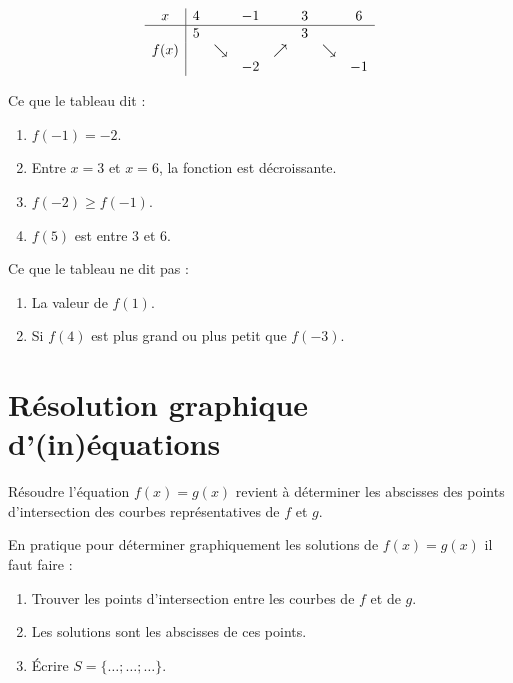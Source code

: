 \begin{example}
    \begin{equation*}
        \begin{array}[]{c|ccccccc}
            x&4&&-1&&3&&6\\
            \hline
            &5&&&&3&&\\
            f(x)&&\searrow&&\nearrow&&\searrow&\\
            &&&-2&&&&-1\\
        \end{array}
    \end{equation*}

Ce que le tableau dit :
\begin{enumerate}
    \item
        \( f(-1)=-2\).
    \item
        Entre \( x=3\) et \( x=6\), la fonction est décroissante.
    \item
        \( f(-2)\geq f(-1)\).
    \item
        \( f(5)\) est entre \( 3\) et \( 6\).
\end{enumerate}
Ce que le tableau ne dit pas :
\begin{enumerate}
    \item
        La valeur de \( f(1)\).
    \item
        Si \( f(4)\) est plus grand ou plus petit que \( f(-3)\).
\end{enumerate}

\end{example}

\section{Résolution graphique d'(in)équations} 

\begin{Aretenir}
    Résoudre l'équation $f(x)=g(x)$ revient à déterminer les abscisses des points d'intersection des courbes représentatives de \( f\) et \( g\).
\end{Aretenir}


En pratique pour déterminer graphiquement les solutions de \( f(x)=g(x)\) il faut faire :
\begin{enumerate}
    \item
        Trouver les points d'intersection entre les courbes de \( f\) et de \( g\).
    \item
        Les solutions sont les abscisses de ces points.
    \item
        Écrire \( S=\{ \ldots;\ldots;\ldots \}\).
\end{enumerate}

